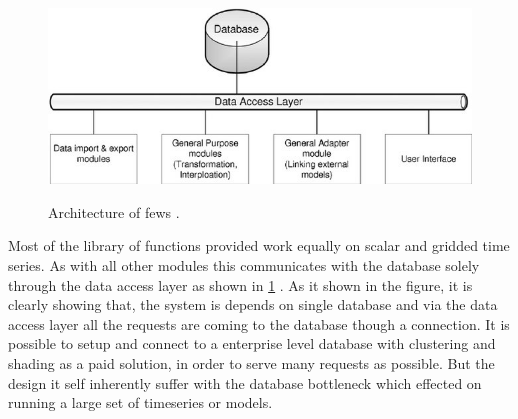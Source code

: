 \begin{figure}[htp]
    \centering
    \includegraphics[width=1.0\textwidth]{fews/Architecture-of-Delft-FEWS-showing-the-data-base-the-data-access-layers-and-examples-of_W640.jpg}\\
    \caption[Architecture of \acrshort{fews}]{Architecture of \acrshort{fews} \cite{Werner2013TheSystem}.}
    \label{fi:fews_data_layer}
\end{figure}
Most of the library of functions provided work equally on scalar and gridded time series. As with all other modules this communicates with the database solely through the data access layer as shown in \ref{fi:fews_data_layer} \cite{Werner2013TheSystem}. As it shown in the figure, it is clearly showing that, the system is depends on single database and via the data access layer all the requests are coming to the database though a connection. It is possible to setup and connect to a enterprise level database with clustering and shading as a paid solution, in order to serve many requests as possible. But the design it self inherently suffer with the database bottleneck which effected on running a large set of timeseries or models.

